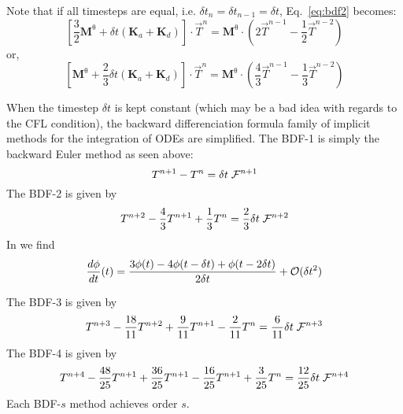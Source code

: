Note that if all timesteps are equal, i.e. $\delta t_n=\delta t_{n-1}=\delta t$, Eq.~\eqref{eq:bdf2} becomes:
\[
\left[
\frac{3}{2}
{\bm M}^\uptheta
+ \delta t({\bm K}_a + {\bm K}_d)
\right]
 \cdot \vec T^n =
{\bm M}^\uptheta \cdot \left(2 \vec T^{n-1} - \frac{1}{2} \vec T^{n-2} \right)
\]
or, 
\[
\left[
{\bm M}^\uptheta
+ \frac{2}{3}\delta t({\bm K}_a + {\bm K}_d)
\right]
 \cdot \vec T^n =
{\bm M}^\uptheta \cdot \left( \frac{4}{3} \vec T^{n-1} - \frac{1}{3} \vec T^{n-2} \right)
\]

When the timestep $\delta t$ is kept constant (which may be a bad idea with regards to the CFL condition),
the backward differenciation formula family of implicit methods
for the integration of ODEs are simplified. 
The BDF-1 is simply the backward Euler method as seen above:
\[
T^{n+1}-T^n=\delta t\;  {\cal F}^{n+1}
\]
The BDF-2 is given by 
\[
T^{n+2} - \frac{4}{3}T^{n+1} +\frac{1}{3} T^n = \frac{2}{3} \delta t\;  {\cal F}^{n+2}
\]
In \textcite{saramito} we find
\[
\frac{d\phi}{dt}(t) = \frac{3\phi(t)-4\phi(t-\delta t)+\phi(t-2\delta t)}{2\delta t} + {\cal O}(\delta t^2)
\]

The BDF-3 is given by 
\[
T^{n+3} - \frac{18}{11}T^{n+2} +\frac{9}{11} T^{n+1} -\frac{2}{11}T^n = \frac{6}{11} \delta t \; {\cal F}^{n+3}
\]
The BDF-4 is given by 
\[
T^{n+4}-\frac{48}{25}T^{n+1}+\frac{36}{25}T^{n+1}-\frac{16}{25}T^{n+1}+\frac{3}{25}T^n 
= \frac{12}{25}\delta t\;  {\cal F}^{n+4}
\]
Each BDF-$s$ method achieves order $s$.






